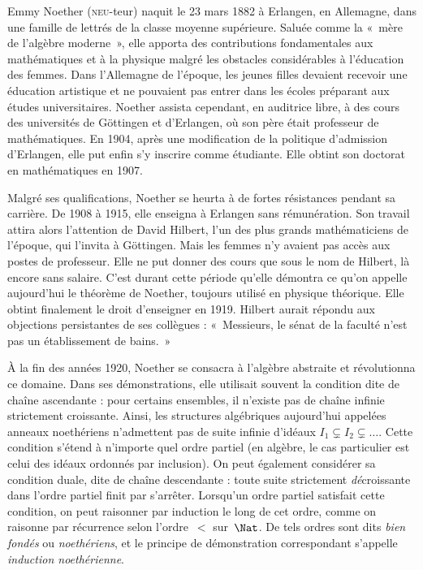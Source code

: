 \documentclass[../../../include/open-logic-section]{subfiles}
\begin{document}



Emmy Noether
(\textsc{neu}-teur)
naquit le
23 mars 1882
à Erlangen,
en Allemagne,
dans une famille
de lettrés
de la classe
moyenne supérieure.
Saluée comme
la «~mère
de l'algèbre
moderne~»,
elle apporta
des contributions
fondamentales
aux mathématiques
et à la physique
malgré les
obstacles
considérables
à l'éducation
des femmes.
Dans l'Allemagne
de l'époque,
les jeunes filles
devaient recevoir
une éducation
artistique et
ne pouvaient
pas entrer
dans les écoles
préparant aux
études universitaires.
Noether assista
cependant, en
auditrice libre,
à des cours
des universités
de G\"{o}ttingen
et d'Erlangen,
où son père
était professeur
de mathématiques.
En 1904,
après une
modification
de la politique
d'admission
d'Erlangen,
elle put enfin
s'y inscrire
comme étudiante.
Elle obtint
son doctorat
en mathématiques
en 1907.

Malgré ses
qualifications,
Noether se
heurta à de
fortes résistances
pendant sa
carrière.
De 1908 à 1915,
elle enseigna
à Erlangen
sans rémunération.
Son travail
attira alors
l'attention de
David Hilbert,
l'un des plus
grands mathématiciens
de l'époque,
qui l'invita
à G\"{o}ttingen.
Mais les femmes
n'y avaient pas
accès aux postes
de professeur.
Elle ne put
donner des cours
que sous le nom
de Hilbert,
là encore
sans salaire.
C'est durant
cette période
qu'elle démontra
ce qu'on appelle
aujourd'hui
le théorème
de Noether,
toujours utilisé
en physique
théorique.
Elle obtint
finalement le
droit d'enseigner
en 1919.
Hilbert aurait
répondu aux
objections persistantes
de ses collègues :
«~Messieurs,
le sénat de
la faculté
n'est pas
un établissement
de bains.~»

À la fin
des années 1920,
Noether se consacra
à l'algèbre
abstraite et
révolutionna
ce domaine.
Dans ses
démonstrations,
elle utilisait
souvent la
condition dite
de chaîne
ascendante :
pour certains
ensembles, il
n'existe pas
de chaîne
infinie strictement
croissante.
Ainsi, les
structures
algébriques
aujourd'hui
appelées anneaux
noethériens
n'admettent pas
de suite infinie
d'idéaux
$I_1 \subsetneq
I_2 \subsetneq
\dots$.
Cette condition
s'étend à
n'importe quel
ordre partiel
(en algèbre,
le cas particulier
est celui des
idéaux ordonnés
par inclusion).
On peut également
considérer sa
condition duale,
dite de chaîne
descendante :
toute suite
strictement
\emph{dé}croissante
dans l'ordre
partiel finit
par s'arrêter.
Lorsqu'un ordre
partiel satisfait
cette condition,
on peut raisonner
par induction
le long de
cet ordre,
comme on raisonne
par récurrence
selon l'ordre~$<$
sur~$\Nat$.
De tels ordres
sont dits
\emph{bien fondés}
ou \emph{noethériens},
et le principe
de démonstration
correspondant
s'appelle
\emph{induction
noethérienne}.
\end{document}
